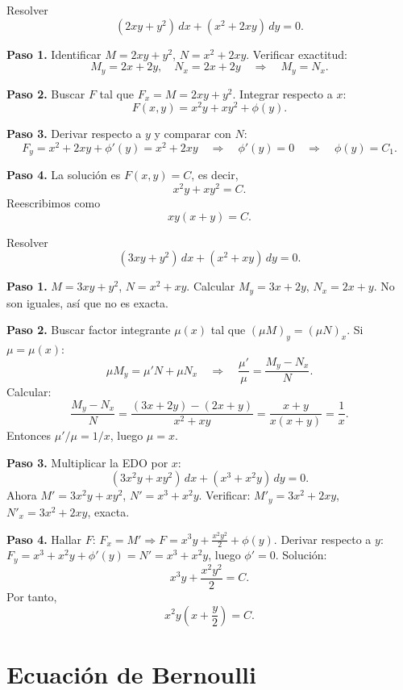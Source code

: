 \begin{example}
Resolver
\[
(2xy + y^2)\,dx + (x^2 + 2xy)\,dy = 0.
\]

\begin{myproof}
\textbf{Paso 1.} Identificar \(M=2xy+y^2\), \(N=x^2+2xy\). Verificar exactitud:
\[
M_y = 2x + 2y, \quad N_x = 2x + 2y \quad\Rightarrow\quad M_y = N_x.
\]

\textbf{Paso 2.} Buscar \(F\) tal que \(F_x = M = 2xy+y^2\). Integrar respecto a \(x\):
\[
F(x,y) = x^2 y + x y^2 + \phi(y).
\]

\textbf{Paso 3.} Derivar respecto a \(y\) y comparar con \(N\):
\[
F_y = x^2 + 2xy + \phi'(y) = x^2 + 2xy \quad\Rightarrow\quad \phi'(y)=0 \quad\Rightarrow\quad \phi(y)=C_1.
\]

\textbf{Paso 4.} La solución es \(F(x,y)=C\), es decir,
\[
x^2 y + x y^2 = C.
\]
Reescribimos como
\[
\boxed{xy(x+y)=C}.
\]
\end{myproof}
\end{example}

\begin{example}
Resolver
\[
(3xy + y^2)\,dx + (x^2 + xy)\,dy = 0.
\]

\begin{myproof}
\textbf{Paso 1.} \(M=3xy+y^2\), \(N=x^2+xy\). Calcular \(M_y = 3x+2y\), \(N_x = 2x+y\). No son iguales, así que no es exacta.

\textbf{Paso 2.} Buscar factor integrante \(\mu(x)\) tal que \((\mu M)_y = (\mu N)_x\). Si \(\mu=\mu(x)\):
\[
\mu M_y = \mu' N + \mu N_x \quad\Rightarrow\quad \frac{\mu'}{\mu} = \frac{M_y - N_x}{N}.
\]
Calcular:
\[
\frac{M_y - N_x}{N} = \frac{(3x+2y) - (2x+y)}{x^2+xy} = \frac{x+y}{x(x+y)} = \frac{1}{x}.
\]
Entonces \(\mu'/\mu = 1/x\), luego \(\mu = x\).

\textbf{Paso 3.} Multiplicar la EDO por \(x\):
\[
(3x^2 y + x y^2)\,dx + (x^3 + x^2 y)\,dy = 0.
\]
Ahora \(M' = 3x^2 y + x y^2\), \(N' = x^3 + x^2 y\). Verificar: \(M'_y = 3x^2+2xy\), \(N'_x = 3x^2+2xy\), exacta.

\textbf{Paso 4.} Hallar \(F\): \(F_x = M' \Rightarrow F = x^3 y + \frac{x^2 y^2}{2} + \phi(y)\). Derivar respecto a \(y\): \(F_y = x^3 + x^2 y + \phi'(y) = N' = x^3 + x^2 y\), luego \(\phi'=0\). Solución:
\[
x^3 y + \frac{x^2 y^2}{2} = C.
\]
Por tanto,
\[
\boxed{x^2 y\left(x + \frac{y}{2}\right) = C}.
\]
\end{myproof}
\end{example}

\section{Ecuación de Bernoulli}

